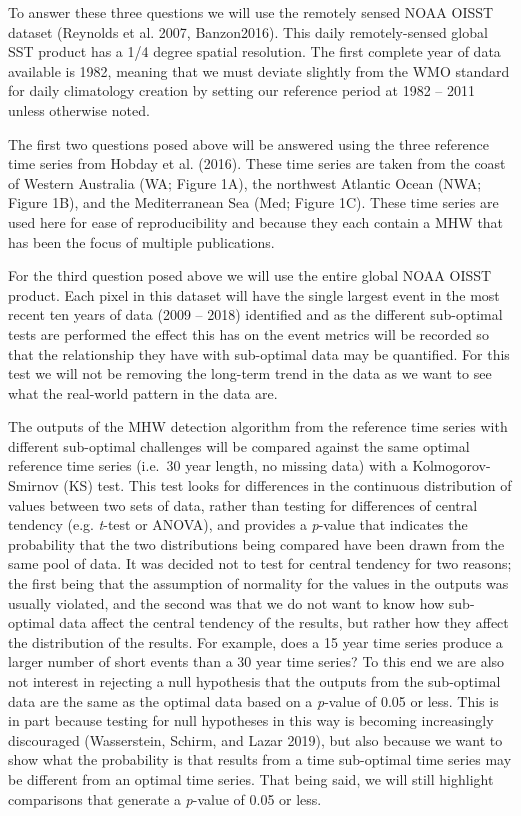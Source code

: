 \documentclass[]{article}
\begin{document}
{To answer these three questions we will use the remotely sensed NOAA
OISST dataset (Reynolds et al. 2007, Banzon2016). This daily
remotely-sensed global SST product has a 1/4 degree spatial resolution.
The first complete year of data available is 1982, meaning that we must
deviate slightly from the WMO standard for daily climatology creation by
setting our reference period at 1982 -- 2011 unless otherwise noted.

The first two questions posed above will be answered using the three
reference time series from Hobday et al. (2016). These time series are
taken from the coast of Western Australia (WA; Figure 1A), the northwest
Atlantic Ocean (NWA; Figure 1B), and the Mediterranean Sea (Med; Figure
1C). These time series are used here for ease of reproducibility and
because they each contain a MHW that has been the focus of multiple
publications.

For the third question posed above we will use the entire global NOAA
OISST product. Each pixel in this dataset will have the single largest
event in the most recent ten years of data (2009 -- 2018) identified and
as the different sub-optimal tests are performed the effect this has on
the event metrics will be recorded so that the relationship they have
with sub-optimal data may be quantified. For this test we will not be
removing the long-term trend in the data as we want to see what the
real-world pattern in the data are.

The outputs of the MHW detection algorithm from the reference time
series with different sub-optimal challenges will be compared against
the same optimal reference time series (i.e.~30 year length, no missing
data) with a Kolmogorov-Smirnov (KS) test. This test looks for
differences in the continuous distribution of values between two sets of
data, rather than testing for differences of central tendency (e.g.
\emph{t}-test or ANOVA), and provides a \emph{p}-value that indicates
the probability that the two distributions being compared have been
drawn from the same pool of data. It was decided not to test for central
tendency for two reasons; the first being that the assumption of
normality for the values in the outputs was usually violated, and the
second was that we do not want to know how sub-optimal data affect the
central tendency of the results, but rather how they affect the
distribution of the results. For example, does a 15 year time series
produce a larger number of short events than a 30 year time series? To
this end we are also not interest in rejecting a null hypothesis that
the outputs from the sub-optimal data are the same as the optimal data
based on a \emph{p}-value of 0.05 or less. This is in part because
testing for null hypotheses in this way is becoming increasingly
discouraged (Wasserstein, Schirm, and Lazar 2019), but also because we
want to show what the probability is that results from a time
sub-optimal time series may be different from an optimal time series.
That being said, we will still highlight comparisons that generate a
\emph{p}-value of 0.05 or less.

}
\end{document}
